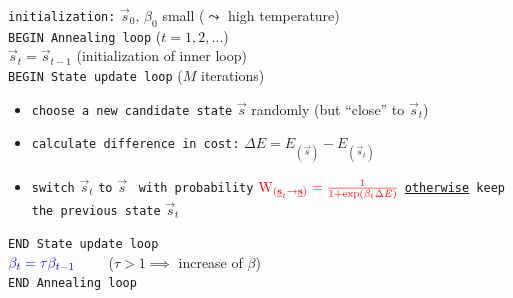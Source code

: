 \begin{frame}


\texttt{initialization:} $\vec{s}_0, \, \beta_0$ small ($\leadsto$ high temperature) \\

\texttt{BEGIN Annealing loop} ($t=1,2,\dots$)\\

\oident$\vec{s}_t = \vec{s}_{t-1}$ {\tiny(initialization of inner loop)} \\

\oident \texttt{BEGIN State update loop} ($M$ iterations)\\

\begin{itemize}
\item \texttt{choose a new candidate state} $\vec{s}$ randomly {(but ``close'' to $\vec{s}_t$)}\\

\item \texttt{calculate difference in cost:}
       \oident$\Delta E = E_{(\vec{s})}- E_{(\vec{s}_t)}$\\
\item 
\texttt{switch} $\vec{s}_t$ \texttt{to} $\vec{s}$ \texttt{ with probability} 
       $\color{red}\mathrm{W}_{(\vec{s}_t \rightarrow \vec{s})} =
	\frac{1}{1 + \exp( \beta_t \Delta E)}$
\texttt{\underline{otherwise} keep the previous state} $\vec{s}_t$
\end{itemize}
\oident\texttt{END State update loop} \\

\oident$\color{blue}\beta_t = \tau \beta_{t-1}\qquad $ {\footnotesize($\tau>1\implies$ increase of $\beta$)} \\ %

\texttt{END Annealing loop}

\end{frame}




